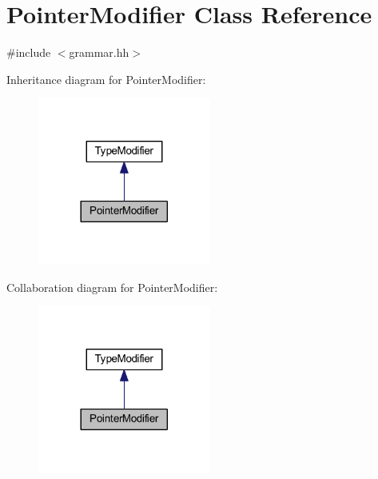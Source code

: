 \hypertarget{class_pointer_modifier}{}\section{Pointer\+Modifier Class Reference}
\label{class_pointer_modifier}


{\ttfamily \#include $<$grammar.\+hh$>$}



Inheritance diagram for Pointer\+Modifier\+:
\nopagebreak
\begin{figure}[H]
\begin{center}
\leavevmode
\includegraphics[width=161pt]{class_pointer_modifier__inherit__graph}
\end{center}
\end{figure}


Collaboration diagram for Pointer\+Modifier\+:
\nopagebreak
\begin{figure}[H]
\begin{center}
\leavevmode
\includegraphics[width=161pt]{class_pointer_modifier__coll__graph}
\end{center}
\end{figure}
